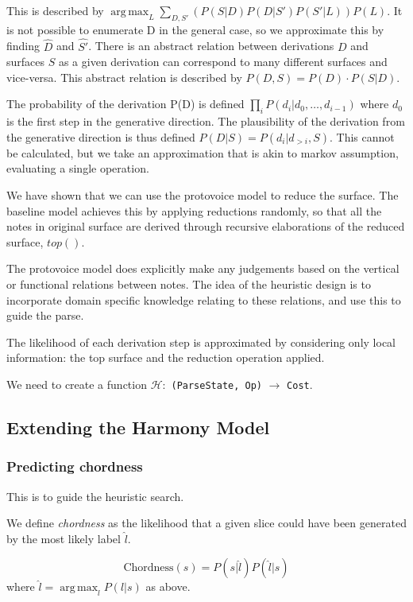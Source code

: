 \documentclass[12pt,a4paper,twoside,openright]{report}
\DeclareMathOperator*{\argmax}{arg\,max}
\theoremstyle{definition}
\begin{document}
This is described by $\argmax_L \sum\limits_{D,S'}(P(S|D)P(D|S')P(S'|L)) P(L)$. 
It is not possible to enumerate D in the general case, so we approximate this by finding $\hat{D}$ and $\hat{S'}$. 
There is an abstract relation between derivations $D$ and surfaces $S$ as a given derivation can correspond to many different surfaces and vice-versa. 
This abstract relation is described by $P(D, S) = P(D)\cdot P(S|D)$. 

The probability of the derivation P(D) is defined $\prod_i P(d_i | d_0, \dots, d_{i-1})$ where $d_0$ is the first step in the generative direction. 
The plausibility of the derivation from the generative direction is thus defined $P(D|S) = P(d_i|d_{>i}, S)$. This cannot be calculated, but we take an approximation that is akin to markov assumption, evaluating a single operation. 

We have shown that we can use the protovoice model to reduce the surface.
The baseline model achieves this by applying reductions randomly, so that all the notes in original surface are derived through recursive elaborations of the reduced surface, $top()$.

The protovoice model does explicitly make any judgements based on the vertical or functional relations between notes. 
The idea of the heuristic design is to incorporate domain specific knowledge relating to these relations, and use this to guide the parse. 

The likelihood of each derivation step is approximated by considering only local information: the top surface and the reduction operation applied.

We need to create a function $\mathcal{H}:$ \texttt{(ParseState, Op)} $\to$ \texttt{Cost}. 

\subsection{Extending the Harmony Model}

\subsubsection{Predicting chordness}
This is to guide the heuristic search.

We define \textit{chordness} as the likelihood that a given slice could have been generated by the most likely label $\hat{l}$.

\begin{equation}
  \text{Chordness}(s) = P(s | \hat{l}) P(\hat{l} | s) 
  \label{eq:chordness}
\end{equation}
where $\hat{l} = \argmax_l P(l | s)$ as above.
\end{document}
